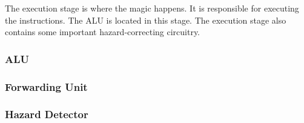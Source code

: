The execution stage is where the magic happens.
It is responsible for executing the instructions.
The ALU is located in this stage.
The execution stage also contains some important hazard-correcting circuitry.

\subsubsection{ALU}
    

\subsubsection{Forwarding Unit}
    

\subsubsection{Hazard Detector}
    
